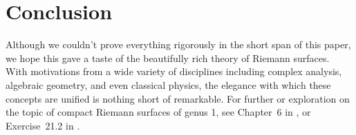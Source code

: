 \documentclass{lkx_paper}
\begin{document}
\section{Conclusion}

Although we couldn't prove everything rigorously in the short span of this paper, we hope this gave a taste of the beautifully rich theory of Riemann surfaces. With motivations from a wide variety of disciplines including complex analysis, algebraic geometry, and even classical physics, the elegance with which these concepts are unified is nothing short of remarkable. For further or exploration on the topic of compact Riemann surfaces of genus 1, see Chapter~6 in \cite{donaldson}, or Exercise~21.2 in \cite{forster}.

{}

\end{document}
